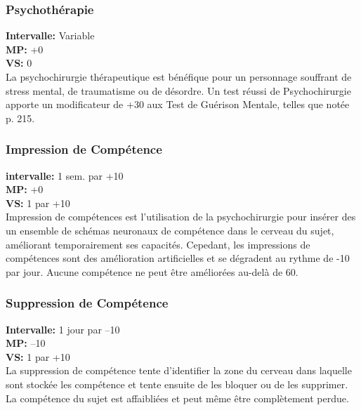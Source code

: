 \subsubsection{Psychothérapie} \textbf{Intervalle:} Variable \\ \textbf{MP:} +0 \\ \textbf{VS:} 0 \\ La psychochirurgie thérapeutique est bénéfique pour un personnage souffrant de stress mental, de traumatisme ou de désordre. Un test réussi de Psychochirurgie apporte un modificateur de +30 aux Test de Guérison Mentale, telles que notée p. 215. 

\subsubsection{Impression de Compétence} \textbf{intervalle:} 1 sem. par +10 \\ \textbf{MP:} +0 \\ \textbf{VS:} 1 par +10\\ Impression de compétences est l'utilisation de la psychochirurgie pour insérer des un ensemble de schémas neuronaux de compétence dans le cerveau du sujet, améliorant temporairement ses capacités. Cepedant, les impressions de compétences sont des amélioration artificielles et se dégradent au rythme de -10 par jour. Aucune compétence ne peut être améliorées au-delà de 60. 

\subsubsection{Suppression de Compétence} \textbf{Intervalle:} 1 jour par –10 \\ \textbf{MP:} –10 \\ \textbf{VS:} 1 par +10\\ La suppression de compétence tente d'identifier la zone du cerveau dans laquelle sont stockée les compétence et tente ensuite de les bloquer ou de les supprimer. La compétence du sujet est affaibliées et peut même être complètement perdue. 

